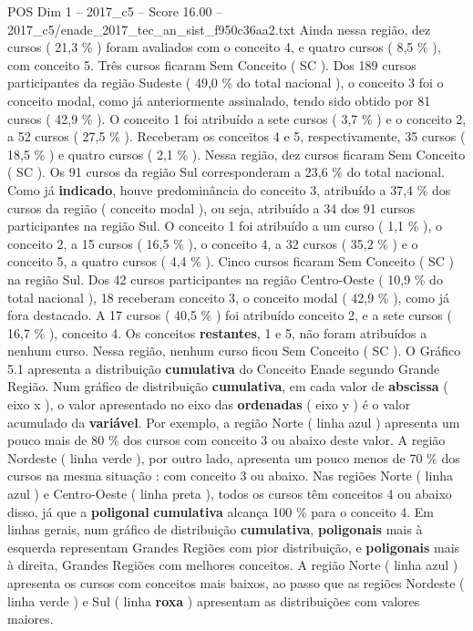\begin{textsample}{POS Dim 1 – 2017\_c5 – Score 16.00 – 2017\_c5/enade\_2017\_tec\_an\_sist\_f950c36aa2.txt}
Ainda nessa região, dez cursos ( 21,3 \% ) foram avaliados com o conceito 4, e quatro cursos ( 8,5 \% ), com conceito 5.
Três cursos ficaram Sem Conceito ( SC ).
Dos 189 cursos participantes da região Sudeste ( 49,0 \% do total nacional ), o conceito 3 foi o conceito modal, como já anteriormente assinalado, tendo sido obtido por 81 cursos ( 42,9 \% ).
O conceito 1 foi atribuído a sete cursos ( 3,7 \% ) e o conceito 2, a 52 cursos ( 27,5 \% ).
Receberam os conceitos 4 e 5, respectivamente, 35 cursos ( 18,5 \% ) e quatro cursos ( 2,1 \% ).
Nessa região, dez cursos ficaram Sem Conceito ( SC ).
Os 91 cursos da região Sul corresponderam a 23,6 \% do total nacional.
Como já \textbf{indicado}, houve predominância do conceito 3, atribuído a 37,4 \% dos cursos da região ( conceito modal ), ou seja, atribuído a 34 dos 91 cursos participantes na região Sul.
O conceito 1 foi atribuído a um curso ( 1,1 \% ), o conceito 2, a 15 cursos ( 16,5 \% ), o conceito 4, a 32 cursos ( 35,2 \% ) e o conceito 5, a quatro cursos ( 4,4 \% ).
Cinco cursos ficaram Sem Conceito ( SC ) na região Sul.
Dos 42 cursos participantes na região Centro-Oeste ( 10,9 \% do total nacional ), 18 receberam conceito 3, o conceito modal ( 42,9 \% ), como já fora destacado.
A 17 cursos ( 40,5 \% ) foi atribuído conceito 2, e a sete cursos ( 16,7 \% ), conceito 4.
Os conceitos \textbf{restantes}, 1 e 5, não foram atribuídos a nenhum curso.
Nessa região, nenhum curso ficou Sem Conceito ( SC ).
O Gráfico 5.1 apresenta a distribuição \textbf{cumulativa} do Conceito Enade segundo Grande Região.
Num gráfico de distribuição \textbf{cumulativa}, em cada valor de \textbf{abscissa} ( eixo x ), o valor apresentado no eixo das \textbf{ordenadas} ( eixo y ) é o valor acumulado da \textbf{variável}.
Por exemplo, a região Norte ( linha azul ) apresenta um pouco mais de 80 \% dos cursos com conceito 3 ou abaixo deste valor.
A região Nordeste ( linha verde ), por outro lado, apresenta um pouco menos de 70 \% dos cursos na mesma situação : com conceito 3 ou abaixo.
Nas regiões Norte ( linha azul ) e Centro-Oeste ( linha preta ), todos os cursos têm conceitos 4 ou abaixo disso, já que a \textbf{poligonal} \textbf{cumulativa} alcança 100 \% para o conceito 4.
Em linhas gerais, num gráfico de distribuição \textbf{cumulativa}, \textbf{poligonais} mais à esquerda representam Grandes Regiões com pior distribuição, e \textbf{poligonais} mais à direita, Grandes Regiões com melhores conceitos.
A região Norte ( linha azul ) apresenta os cursos com conceitos mais baixos, ao passo que as regiões Nordeste ( linha verde ) e Sul ( linha \textbf{roxa} ) apresentam as distribuições com valores maiores.

\end{textsample}
